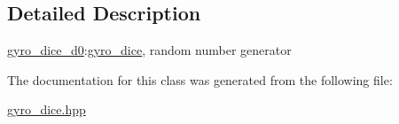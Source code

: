 \subsection{Detailed Description}
\hyperlink{classgyro__dice__d0}{gyro\+\_\+dice\+\_\+d0}\+:\hyperlink{classgyro__dice}{gyro\+\_\+dice}, random number generator 

The documentation for this class was generated from the following file\+:\begin{DoxyCompactItemize}
\item 
\hyperlink{gyro__dice_8hpp}{gyro\+\_\+dice.\+hpp}\end{DoxyCompactItemize}
